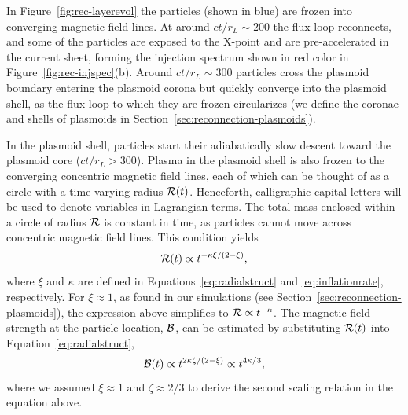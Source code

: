In Figure~\ref{fig:rec-layerevol} the particles (shown in blue) are frozen into converging magnetic field lines. At around $ct/r_L\sim 200$ the flux loop reconnects, and some of the particles are exposed to the X-point and are pre-accelerated in the current sheet, forming the injection spectrum shown in red color in Figure~\ref{fig:rec-injspec}(b). Around $ct/r_L\sim 300$ particles cross the plasmoid boundary entering the plasmoid corona but quickly converge into the plasmoid shell, as the flux loop to which they are frozen circularizes (we define the coronae and shells of plasmoids in Section~\ref{sec:reconnection-plasmoids}).

In the plasmoid shell, particles start their adiabatically slow descent toward the plasmoid core ($ct/r_L > 300$). Plasma in the plasmoid shell is also frozen to the converging concentric magnetic field lines, each of which can be thought of as a circle with a time-varying radius $\mathcal{R}(t)$. Henceforth, calligraphic capital letters will be used to denote variables in Lagrangian terms. The total mass enclosed within a circle of radius $\mathcal{R}$ is constant in time, as particles cannot move across concentric magnetic field lines. This condition yields
\begin{equation}
    \label{eq:rL_vs_t}
    \mathcal{R}(t)\propto t^{-\kappa\xi/(2-\xi)},
\end{equation}
where $\xi$ and $\kappa$ are defined in Equations~\eqref{eq:radialstruct} and \eqref{eq:inflationrate}, respectively. For $\xi\approx 1$, as found in our simulations (see Section~\ref{sec:reconnection-plasmoids}), the expression above simplifies to $\mathcal{R} \propto t^{-\kappa}$. The magnetic field strength at the particle location, $\mathcal{B}$, can be estimated by substituting $\mathcal{R}(t)$ into Equation~\eqref{eq:radialstruct},
\begin{equation}
    \label{eq:BL_vs_t}
    \mathcal{B}(t)\propto t^{2\kappa \zeta/(2-\xi)}\propto t^{4\kappa/3},
\end{equation}
where we assumed $\xi\approx 1$ and $\zeta\approx 2/3$ to derive the second scaling relation in the equation above.


